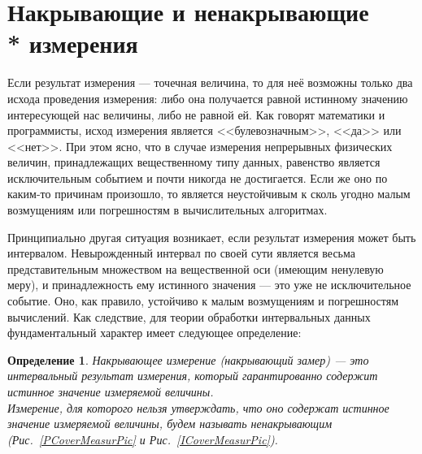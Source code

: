 \documentclass[a5paper,openany]{book}
\newtheorem{definition}{Определение}[section]
\begin{document}
\section[Накрывающие и ненакрывающие измерения]%
        {Накрывающие и ненакрывающие \\* измерения} 
\label{CoverMeasrSect} 
  
  
Если результат измерения --- точечная величина, то для неё возможны только два исхода 
проведения измерения: либо она получается равной истинному значению интересующей нас 
величины, либо не равной ей. Как говорят математики и программисты, исход измерения 
является <<булевозначным>>, <<да>> или <<нет>>. При этом ясно, что в случае измерения 
непрерывных физических величин, принадлежащих вещественному типу данных, равенство 
является исключительным событием и почти никогда не достигается. Если же оно 
по каким-то причинам произошло, то является неустойчивым к сколь угодно малым 
возмущениям или погрешностям в вычислительных алгоритмах. 
  
Принципиально другая ситуация возникает, если результат измерения может быть интервалом. 
Невырожденный интервал по своей сути является весьма представительным множеством на  
вещественной оси (имеющим ненулевую меру), и принадлежность ему истинного значения --- 
это уже не исключительное событие. Оно, как правило, устойчиво к малым возмущениям и 
погрешностям вычислений. Как следствие, для теории обработки интервальных данных 
фундаментальный характер имеет следующее определение: 
  
\begin{definition}
\textsl{Накрывающее измерение} (накрывающий замер) --- это интервальный результат 
измерения, который гарантированно содержит истинное значение измеряемой величины. \\ 
Измерение, для которого нельзя утверждать, что оно содержат истинное значение 
измеряемой величины, будем называть \textsl{ненакрывающим} 
{\rm(Рис.~\ref{PCoverMeasurPic}} и {\rm Рис.~\ref{ICoverMeasurPic})}. 
\end{definition}
  
  
\end{document}
